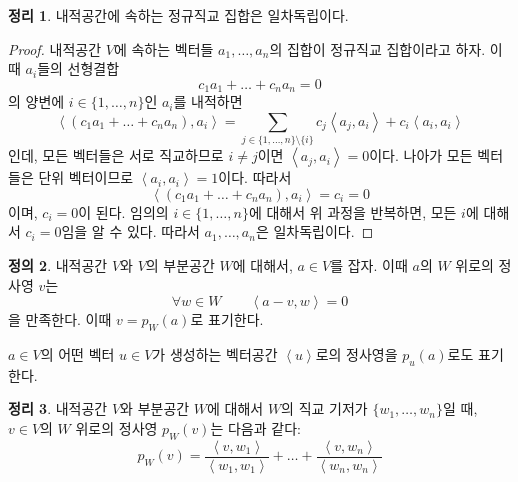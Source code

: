 \documentclass[unfonts,oneside,a4paper]{oblivoir}
\theoremstyle{definition}
\newtheorem{definition}{정의}[section]
\theoremstyle{theorem}
\newtheorem{theorem}[definition]{정리}
\theoremstyle{theorem}
\theoremstyle{remark}
\theoremstyle{remark}
\theoremstyle{remark}
\theoremstyle{remark}
\renewcommand{\vec}[1]{\bm{\mathit{#1}}}
\begin{document}
\begin{theorem}
    내적공간에 속하는 정규직교 집합은 일차독립이다.
\end{theorem}

\begin{proof}
    내적공간 $V$에 속하는 벡터들 $\vec a_1, \dots, \vec a_n$의 집합이 정규직교 집합이라고 하자.
    이때 $\vec a_i$들의 선형결합
    \begin{equation*}
        c_1 \vec a_1 + \dots + c_n \vec a_n = 0
    \end{equation*}
    의 양변에 $i \in \{1, \dots, n\}$인 $\vec a_i$를 내적하면
    \begin{equation*}
        \left<(c_1 \vec a_1 + \dots + c_n \vec a_n), \vec a_i\right> = \sum_{j \in \{1, \dots, n\} \setminus \{i\}} c_j \left<\vec a_j, \vec a_i\right> + c_i \left<\vec a_i, \vec a_i\right>
    \end{equation*}
    인데, 모든 벡터들은 서로 직교하므로 $i \neq j$이면 $\left<\vec a_j, \vec a_i\right> = 0$이다.
    나아가 모든 벡터들은 단위 벡터이므로 $\left<\vec a_i, \vec a_i\right> = 1$이다.
    따라서
    \begin{equation*}
        \left<(c_1 \vec a_1 + \dots + c_n \vec a_n), \vec a_i\right> = c_i = 0
    \end{equation*}
    이며, $c_i = 0$이 된다.
    임의의 $i \in \{1, \dots, n\}$에 대해서 위 과정을 반복하면, 모든 $i$에 대해서 $c_i = 0$임을 알 수 있다.
    따라서 $\vec a_1, \dots, \vec a_n$은 일차독립이다.
\end{proof}

\begin{definition}
    내적공간 $V$와 $V$의 부분공간 $W$에 대해서, $\vec a \in V$를 잡자.
    이때 $\vec a$의 $W$ 위로의 정사영 $\vec v$는 
    \begin{equation*}
        \forall \vec w \in W \qquad \left<\vec a - \vec v, \vec w\right> = 0
    \end{equation*}
    을 만족한다.
    이때 $\vec v = p_W (\vec a)$로 표기한다.

    $\vec a \in V$의 어떤 벡터 $\vec u \in V$가 생성하는 벡터공간 $\left<\vec u\right>$로의 정사영을 $p_{\vec u} (\vec a)$로도 표기한다.
\end{definition}

\begin{theorem}
    내적공간 $V$와 부분공간 $W$에 대해서 $W$의 직교 기저가 $\{\vec w_1, \dots, \vec w_n\}$일 때, $\vec v \in V$의 $W$ 위로의 정사영 $p_W (\vec v)$는 다음과 같다:
    \begin{equation*}
        p_W (\vec v) = \frac{\left<\vec v, \vec w_1\right>}{\left<\vec w_1, \vec w_1\right>} + \dots + \frac{\left<\vec v, \vec w_n\right>}{\left<\vec w_n, \vec w_n\right>}
    \end{equation*}
\end{theorem}
\end{document}
